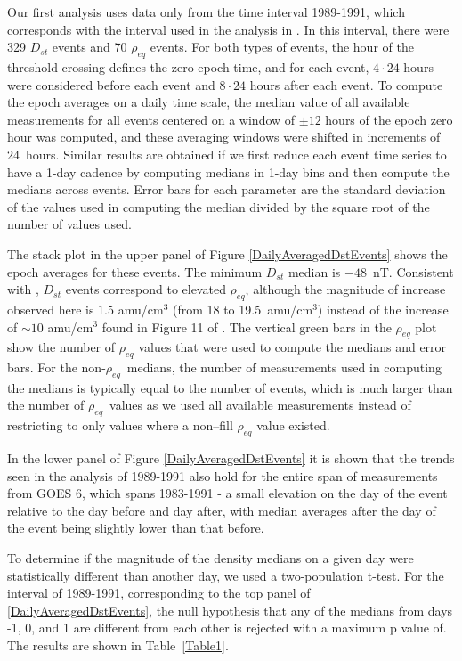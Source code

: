 \documentclass[10pt,twocolumn]{article}
\newcommand{\req}{\ensuremath{\rho_{eq}}}
\begin{document}
Our first analysis uses data only from the time interval 1989-1991, which corresponds with the interval used in the analysis in \cite{Takahashi2010}. In this interval, there were 329 $D_{st}$ events and 70 $\rho_{eq}$ events.  For both types of events, the hour of the threshold crossing defines the zero epoch time, and for each event, $4\cdot24$ hours were considered before each event and $8\cdot24$ hours after each event.  To compute the epoch averages on a daily time scale, the median value of all available measurements for all events centered on a window of $\pm 12$ hours of the epoch zero hour was computed, and these averaging windows were shifted in increments of $24$~hours. Similar results are obtained if we first reduce each event time series to have a 1-day cadence by computing medians in 1-day bins and then compute the medians across events.  Error bars for each parameter are the standard deviation of the values used in computing the median divided by the square root of the number of values used.

The stack plot in the upper panel of Figure \ref{DailyAveragedDstEvents} shows the epoch averages for these events.  The minimum $D_{st}$ median is $-48$~nT.  Consistent with \cite{Takahashi2010}, $D_{st}$ events correspond to elevated $\rho_{eq}$, although the magnitude of increase observed here is $1.5$ amu/cm$^3$ (from 18 to 19.5~amu/cm$^3$) instead of the increase of $\sim 10$ amu/cm$^3$ found in Figure 11 of \cite{Takahashi2010}.  The vertical green bars in the $\rho_{eq}$ plot show the number of $\rho_{eq}$ values that were used to compute the medians and error bars.  For the non-\req\ medians, the number of measurements used in computing the medians is typically equal to the number of events, which is much larger than the number of \req\ values as we used all available measurements instead of restricting to only values where a non--fill $\rho_{eq}$ value existed.

In the lower panel of Figure \ref{DailyAveragedDstEvents} it is shown that the trends seen in the analysis of 1989-1991 also hold for the entire span of measurements from GOES 6, which spans 1983-1991 - a small elevation on the day of the event relative to the day before and day after, with median averages after the day of the event being slightly lower than that before.  

To determine if the magnitude of the density medians on a given day were statistically different than another day, we used a two-population t-test.  For the interval of 1989-1991, corresponding to the top panel of \ref{DailyAveragedDstEvents}, the null hypothesis that any of the medians from days -1, 0, and 1 are different from each other is rejected with a maximum p value of. The results are shown in Table~\ref{Table1}.
\end{document}
